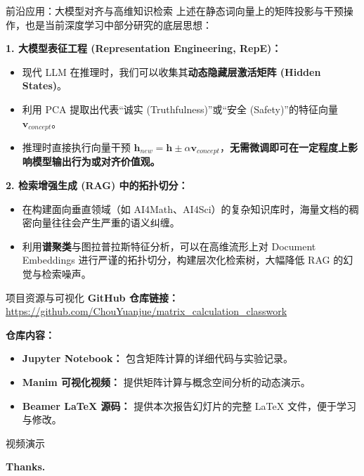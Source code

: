 \documentclass[aspectratio=169]{beamer}
\begin{document}
\begin{frame}{前沿应用：大模型对齐与高维知识检索}
    上述在静态词向量上的矩阵投影与干预操作，也是当前深度学习中部分研究的底层思想：
    
    \vspace{0.3cm}
    \textbf{1. 大模型表征工程 (Representation Engineering, RepE)：}
    \begin{itemize}
        \item 现代 LLM 在推理时，我们可以收集其\textbf{动态隐藏层激活矩阵 (Hidden States)}。
        \item 利用 PCA 提取出代表“诚实 (Truthfulness)”或“安全 (Safety)”的特征向量 $\mathbf{v}_{concept}$。
        \item 推理时直接执行向量干预 $\mathbf{h}_{new} = \mathbf{h} \pm \alpha \mathbf{v}_{concept}$，\textbf{无需微调即可在一定程度上影响模型输出行为或对齐价值观。}
    \end{itemize}
    
    \vspace{0.2cm}
    \textbf{2. 检索增强生成 (RAG) 中的拓扑切分：}
    \begin{itemize}
        \item 在构建面向垂直领域（如 AI4Math、AI4Sci）的复杂知识库时，海量文档的稠密向量往往会产生严重的语义纠缠。
        \item 利用\textbf{谱聚类}与图拉普拉斯特征分析，可以在高维流形上对 Document Embeddings 进行严谨的拓扑切分，构建层次化检索树，大幅降低 RAG 的幻觉与检索噪声。
    \end{itemize}
\end{frame}

\begin{frame}{项目资源与可视化}
    \textbf{GitHub 仓库链接：} \url{https://github.com/ChouYuanjue/matrix_calculation_classwork}

    \vspace{0.5cm}
    \textbf{仓库内容：}
    \begin{itemize}
        \item \textbf{Jupyter Notebook：} 包含矩阵计算的详细代码与实验记录。
        \item \textbf{Manim 可视化视频：} 提供矩阵计算与概念空间分析的动态演示。
        \item \textbf{Beamer \LaTeX{} 源码：} 提供本次报告幻灯片的完整 \LaTeX{} 文件，便于学习与修改。
    \end{itemize}
\end{frame}

\begin{frame}{视频演示}
    \centering
    
\end{frame}

\begin{frame}
    \begin{center}
        \Huge \textbf{Thanks.}
    \end{center}
\end{frame}
\end{document}
